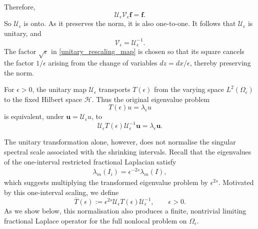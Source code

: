 \documentclass[preprint,12pt]{elsarticle}
\newcommand{\fvect}[1]{\mathbf{#1}}
\begin{document}
Therefore,
\[
    \mathcal U_\epsilon\mathcal V_\epsilon\fvect{f}
    =
    \fvect{f}.
\]
So $\mathcal U_\epsilon$ is onto.
As it preserves the norm, it is also
one-to-one. 
It follows that $\mathcal U_\epsilon$ is unitary, and
\[
    \mathcal V_\epsilon=\mathcal U_\epsilon^{-1}.
\]
The factor $\sqrt{\epsilon}$ in
\eqref{unitary_rescaling_map} is chosen so that its square cancels the
factor $1/\epsilon$ arising from the change of variables
$dz=dx/\epsilon$, thereby preserving the norm.

For $\epsilon>0$, the unitary map $\mathcal U_\epsilon$ transports
$T(\epsilon)$ from the varying space $L^2(\Omega_\epsilon)$ to the
fixed Hilbert space $\mathcal H$. Thus the original eigenvalue problem
\[
    T(\epsilon)u=\lambda_\epsilon u
\]
is equivalent, under $\fvect{u}=\mathcal U_\epsilon u$,
to
\[
    \mathcal U_\epsilon T(\epsilon)\mathcal U_\epsilon^{-1}
    \fvect{u}
    =
    \lambda_\epsilon\fvect{u}.
\]

The unitary transformation alone, however, does not normalise the singular spectral
scale associated with the shrinking intervals. Recall that the
eigenvalues of the one-interval restricted fractional Laplacian
satisfy
\begin{align}\label{singular_scale_factor}
    \lambda_m(I_i)
    =
    \epsilon^{-2s}\lambda_m(I),
\end{align}
which suggests multiplying the transformed
eigenvalue problem by $\epsilon^{2s}$. Motivated by this one-interval scaling, we define
\begin{equation}\label{definition_rescaled_operator}
    \overline T(\epsilon)
    :=
    \epsilon^{2s}
    \mathcal U_\epsilon
    T(\epsilon)
    \mathcal U_\epsilon^{-1},
    \qquad \epsilon>0.
\end{equation}
As we show below, this normalisation also produces
a finite, nontrivial limiting fractional Laplace operator for the full
nonlocal problem on $\Omega_\epsilon$.
\end{document}
